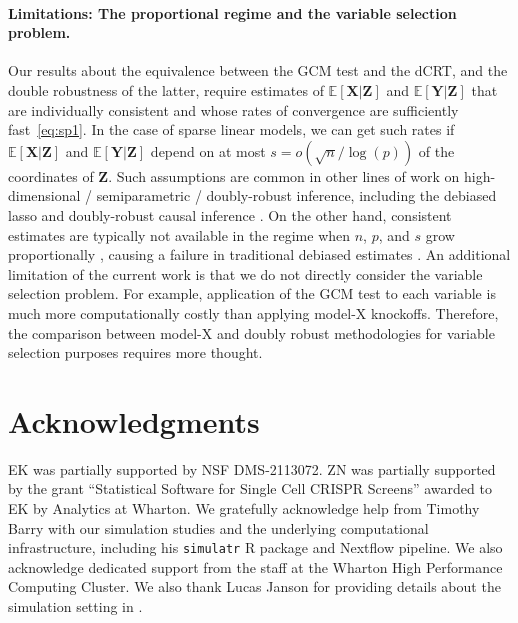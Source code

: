 \documentclass[12pt]{article}
\theoremstyle{definition}
\theoremstyle{remark}
\newcommand{\E}{\mathbb E}								%
\newcommand{\prx}{\bm X}								%
\newcommand{\prz}{\bm Z}								%
\newcommand{\pry}{{\bm Y}}								%
\begin{document}
\paragraph{Limitations: The proportional regime and the variable selection problem.} 

Our results about the equivalence between the GCM test and the dCRT, and the double robustness of the latter, require estimates of $\E[\prx|\prz]$ and $\E[\pry|\prz]$ that are individually consistent and whose rates of convergence are sufficiently fast~\eqref{eq:sp1}. In the case of sparse linear models, we can get such rates if $\E[\prx|\prz]$ and $\E[\pry|\prz]$ depend on at most $s = o(\sqrt{n}/\log(p))$ of the coordinates of $\prz$. Such assumptions are common in other lines of work on high-dimensional / semiparametric / doubly-robust inference, including the debiased lasso \citep{VanDeGeer2014, ZZ14, Javanmard2014, Ning2017, Jankova2018a} and doubly-robust causal inference \citep{BetH14, Chernozhukov2018}. On the other hand, consistent estimates are typically not available in the regime when $n$, $p$, and $s$ grow proportionally \citep{Bayati2011}, causing a failure in traditional debiased estimates \citep{Celentano2021}. An additional limitation of the current work is that we do not directly consider the variable selection problem. For example, application of the GCM test to each variable is much more computationally costly than applying model-X knockoffs. Therefore, the comparison between model-X and doubly robust methodologies for variable selection purposes requires more thought.

\section*{Acknowledgments}

EK was partially supported by NSF DMS-2113072. ZN was partially supported by the grant ``Statistical Software for Single Cell CRISPR Screens'' awarded to EK by Analytics at Wharton. We gratefully acknowledge help from Timothy Barry with our simulation studies and the underlying computational infrastructure, including his \verb|simulatr| R package and Nextflow pipeline. We also acknowledge dedicated support from the staff at the Wharton High Performance Computing Cluster. We also thank Lucas Janson for providing details about the simulation setting in \citet{CetL16}.

\printbibliography

\end{document}
